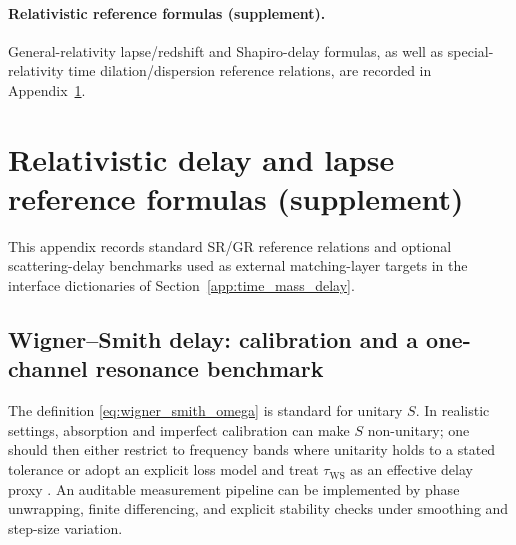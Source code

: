 \paragraph{Relativistic reference formulas (supplement).}
General-relativity lapse/redshift and Shapiro-delay formulas, as well as special-relativity time dilation/dispersion reference relations, are recorded in Appendix~\ref{app:time_mass_delay_reference}.

\section{Relativistic delay and lapse reference formulas (supplement)}
\label{app:time_mass_delay_reference}

This appendix records standard SR/GR reference relations and optional scattering-delay benchmarks used as external matching-layer targets in the interface dictionaries of Section~\ref{app:time_mass_delay}.

\subsection{Wigner--Smith delay: calibration and a one-channel resonance benchmark}
\label{app:wigner_smith_reference}

\begin{remark}
\label{rem:wigner_smith_calibration_losses}
The definition \eqref{eq:wigner_smith_omega} is standard for unitary $S$.
In realistic settings, absorption and imperfect calibration can make $S$ non-unitary; one should then either restrict to frequency bands where unitarity holds to a stated tolerance or adopt an explicit loss model and treat $\tau_{\mathrm{WS}}$ as an effective delay proxy \cite{Wigner1955,Smith1960}.
An auditable measurement pipeline can be implemented by phase unwrapping, finite differencing, and explicit stability checks under smoothing and step-size variation.
\end{remark}

